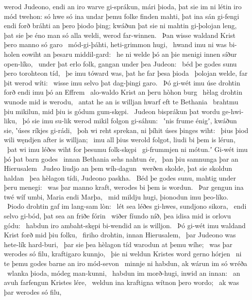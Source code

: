 werod Judeono, endi an iro warve gi-sprákun,
mári þioda, þat sie im ni létin iro mód twehon:
só hwe só ina undar þemu folke finden mahti,
þat ina sán gi-fengi endi forð bráhti
an þero þiodo þing; kwáðun þat sie ni mahtin gi-þolojan leng,
þat sie þe éno man só alla weldi,
werod far-winnen. \hld\ Þan wisse waldand Krist
þero manno só garo \hld\ mód-gi-þáhti,
heti-grimmon hugi, \hld\ hwand imu ni was bi-holen eowiht
an þesaru middil-gard: \hld\ he ni welde þó an þie menigi innen
síður open-líko, \hld\ under þat erlo folk,
gangan under þea Judeon: \hld\ béd þe godes sunu
þero torohteon tíd, \hld\ þe imu tóward was,
þat he far þesa þioda \hld\ þolojan welde,
far þit werod wíti: \hld\ wisse imu selvo
þat dag-þingi garo. \hld\ Þó gi-wét imu úse drohtin forð
endi imu þó an Effrem \hld\ alo-waldo Krist
an þeru hòhon burg \hld\ hèlag drohtin
wunode mid is werodu, \hld\ antat he an is willjan hwarf
eft te Bethania \hld\ brahtmu þiu mikilun,
mid þiu is gódum gum-skępi. \hld\ Judeon bisprákun þat
wordu ge-hwi-liku, \hld\ þó sie imu su-lik werod mikil
folgon gi-sáhun: \hld\ ʽnis frume énigʼ, kwáðun sie,
ʽúses ríkjes gi-rádi, \hld\ þoh wi reht sprekan,
ni þíhit úses þinges wiht: \hld\ þius þiod wili
węndjen after is willjan; \hld\ imu all þius werold folgot,
liudi bi þem is lérun, \hld\ þat wi imu léðes wiht
for þesumu folk-skępi \hld\ gi-frummjen ni mótun.ʼ
Gi-wét imu þó þat barn godes \hld\ innan Bethania
sehs nahtun ér, \hld\ þan þiu samnunga
þar an Hierusalem \hld\ Judeo liudjo
an þem wíh-dagun \hld\ werðen skolde,
þat sie skoldun haldan \hld\ þea hèlagon tídi,
Judeono paskha. \hld\ Béd þe godes sunu,
mahtig under þeru menegi: \hld\ was þar manno kraft,
werodes bi þem is wordun. \hld\ Þar gengun ina twé wíf umbi,
Maria endi Marþa, \hld\ mid mildju hugi,
þionodun imu þeo-líko. \hld\ Þiodo drohtin
gaf im lang-sam lòn: \hld\ lét sea léðes gi-hwes,
sundjono sikora, \hld\ endi selvo gi-bód,
þat sea an friðe fórin \hld\ wiðer fíundo níð,
þea idisa mid is orlovu gódu: \hld\ habdun iro ambaht-skępi
bi-wendid an is willjon. \hld\ Þó gi-wét imu waldand Krist
forð mid þiu folku, \hld\ firiho drohtin,
innan Hierusalem, \hld\ þar Judeono was
hete-lík hard-buri, \hld\ þar sie þea hèlagon tíd
warodun at þemu wíhe; \hld\ was þar werodes só filu,
kraftigaro kunnjo, \hld\ þie ni weldun Kristes word
gerno hórjen \hld\ ni te þemu godes barne
an iro mód-sevon \hld\ minnje ni habdun,
ak wárun im só wréða \hld\ wlanka þioda,
módeg man-kunni, \hld\ habdun im morð-hugi,
inwid an innan: \hld\ an avuh farfengun
Kristes lére, \hld\ weldun ina kraftigna
wítnon þero wordo; \hld\ ak was þar werodes só filu,
